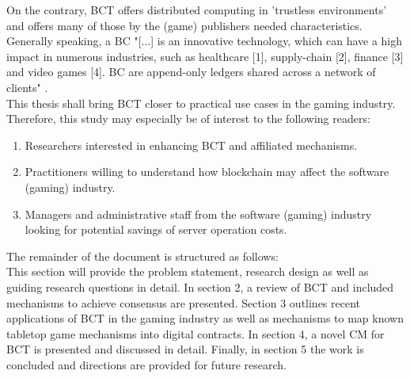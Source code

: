 On the contrary, \gls{BCT} offers distributed computing in 'trustless environments' and
offers many of those by the (game) publishers needed characteristics.
Generally speaking, a \gls{BC} "[...] is an innovative technology, which can have a high impact in numerous industries,
such as healthcare [1], supply-chain [2], finance [3] and video games [4]. BC are append-only ledgers shared across a network of clients" \cite[84]{Besancon.2019}. \\
This thesis shall bring \gls{BCT} closer to practical use cases in the gaming industry.
Therefore, this study may especially be of interest to the following readers:
\begin{enumerate}
	\item Researchers interested in enhancing \gls{BCT} and affiliated mechanisms.
	\item Practitioners willing to understand how blockchain may affect the software (gaming) industry.
	\item Managers and administrative staff from the software (gaming) industry looking for potential savings of server operation costs.
\end{enumerate}
The remainder of the document is structured as follows:\\
This section will provide the problem statement, research design as well as guiding research questions in detail.
In section 2, a review of \gls{BCT} and included mechanisms to achieve consensus are presented.
Section 3 outlines recent applications of \gls{BCT} in the gaming industry as well as mechanisms to map known tabletop game mechanisms into digital contracts.
In section 4, a novel \gls{CM} for \gls{BCT} is presented and discussed in detail.
Finally, in section 5 the work is concluded and directions are provided for future research.



\FloatBarrier

